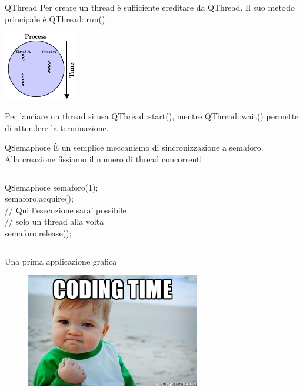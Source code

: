 \documentclass[10pt, aspectratio=169]{beamer}
\begin{document}
\begin{frame}{QThread}
	Per creare un thread è sufficiente ereditare da {\ttfamily QThread}. Il suo metodo principale è {\ttfamily QThread::run()}.\\
	\bigskip
	
	\begin{center}
		\includegraphics[height=3cm]{images/multithread.jpg}
	\end{center}
	
	Per lanciare un thread si usa {\ttfamily QThread::start()}, mentre  {\ttfamily QThread::wait()} permette di attendere la terminazione.
\end{frame}

\lst{%
	\begin{lstlisting}[tabsize=4,basicstyle=\ttfamily]

	\end{lstlisting}
}

\begin{frame}{QSemaphore}
	È un semplice meccanismo di sincronizzazione a semaforo.\\
	Alla creazione fissiamo il numero di thread concorrenti
	\begin{columns}
		\begin{block}{}
			{\ttfamily QSemaphore semaforo(1);\\
				semaforo.acquire();\\
				// Qui l'esecuzione sara' possibile\\
				// solo un thread alla volta\\
				semaforo.release();}
		\end{block}
	\end{columns}
	
\end{frame}


\begin{frame}{Una prima applicazione grafica}
	\begin{figure}
		\includegraphics[height=5cm]{images/coding.jpg}
	\end{figure}
\end{frame}
\end{document}
